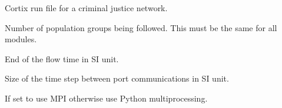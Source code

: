 \documentclass[letterpaper,10pt,openany,oneside,english]{sphinxmanual}
\begin{document}
\begin{fulllineitems}
\label{\detokenize{examples_rst/run_city_justice:run_city_justice.main}}
Cortix run file for a criminal justice network.

\begin{fulllineitems}
\label{\detokenize{examples_rst/run_city_justice:run_city_justice.n_groups}}
 \textendash{} Number of population groups being followed. This must be the same for all
modules.

\end{fulllineitems}


\begin{fulllineitems}
\label{\detokenize{examples_rst/run_city_justice:run_city_justice.end_time}}
 \textendash{} End of the flow time in SI unit.

\end{fulllineitems}


\begin{fulllineitems}
\label{\detokenize{examples_rst/run_city_justice:run_city_justice.time_step}}
 \textendash{} Size of the time step between port communications in SI unit.

\end{fulllineitems}


\begin{fulllineitems}
\label{\detokenize{examples_rst/run_city_justice:run_city_justice.use_mpi}}
 \textendash{} If set to  use MPI otherwise use Python multiprocessing.

\end{fulllineitems}


\end{fulllineitems}
\end{document}
